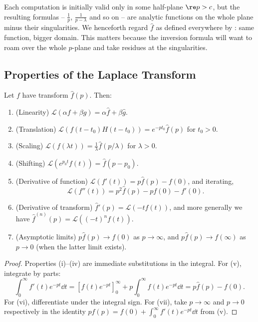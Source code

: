 Each computation is initially valid only in some half-plane $\re p > c$, but the resulting formulas -- $\frac 1p$, $\frac{1}{p - \lambda}$ and so on -- are analytic functions on the whole plane minus their singularities. We henceforth regard $\hat f$ as defined everywhere by : same function, bigger domain. This matters because the inversion formula will want to roam over the whole $p$-plane and take residues at the singularities.

\subsection{Properties of the Laplace Transform}

\begin{proposition}
	Let $f$ have transform $\hat f(p)$. Then:
	\begin{enumerate}[label=(\roman*)]
		\item (Linearity) $\mathcal L(\alpha f + \beta g) = \alpha \hat f + \beta \hat g$.
		\item (Translation) $\mathcal L(f(t - t_0) H(t - t_0)) = e^{-p t_0} \hat f(p)$ for $t_0 > 0$.
		\item (Scaling) $\mathcal L(f(\lambda t)) = \frac{1}{\lambda} \hat f(p/\lambda)$ for $\lambda > 0$.
		\item (Shifting) $\mathcal L(e^{p_0 t} f(t)) = \hat f(p - p_0)$.
		\item (Derivative of function) $\mathcal L(f'(t)) = p \hat f(p) - f(0)$, and iterating,
		$$
		\mathcal L(f''(t)) = p^2 \hat f(p) - p f(0) - f'(0).
		$$
		\item (Derivative of transform) $\hat f'(p) = \mathcal L(-t f(t))$, and more generally we have $\hat f^{(n)}(p) = \mathcal L((-t)^n f(t))$.
		\item (Asymptotic limits) $p \hat f(p) \to f(0)$ as $p \to \infty$, and $p\hat f(p) \to f(\infty)$ as $p \to 0$ (when the latter limit exists).
	\end{enumerate}
\end{proposition}
\begin{proof}
	Properties (i)--(iv) are immediate substitutions in the integral. For (v), integrate by parts:
	$$
	\int_0^\infty f'(t) e^{-pt} \dd t = \left[f(t) e^{-pt}\right]_0^\infty + p \int_0^\infty f(t) e^{-pt}\dd t = p\hat f(p) - f(0).
	$$
	For (vi), differentiate under the integral sign. For (vii), take $p \to \infty$ and $p \to 0$ respectively in the identity $p \hat f(p) = f(0) + \int_0^\infty f'(t) e^{-pt}\dd t$ from (v).
\end{proof}

